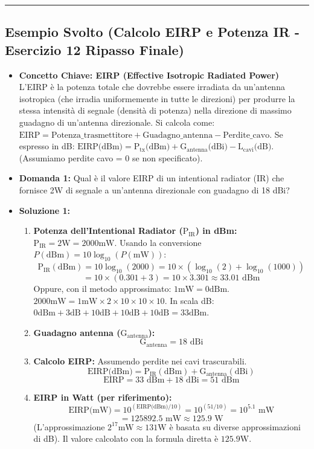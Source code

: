 \hrule %

\subsection{Esempio Svolto (Calcolo EIRP e Potenza IR - Esercizio 12 Ripasso Finale)}
\begin{itemize}
    \item \textbf{Concetto Chiave: EIRP (Effective Isotropic Radiated Power)}
    L'EIRP è la potenza totale che dovrebbe essere irradiata da un'antenna isotropica (che irradia uniformemente in tutte le direzioni) per produrre la stessa intensità di segnale (densità di potenza) nella direzione di massimo guadagno di un'antenna direzionale.
    Si calcola come: $\text{EIRP} = \text{Potenza\_trasmettitore} + \text{Guadagno\_antenna} - \text{Perdite\_cavo}$.
    Se espresso in dB: $\text{EIRP(dBm)} = \text{P}_{\text{tx}}\text{(dBm)} + \text{G}_{\text{antenna}}\text{(dBi)} - \text{L}_{\text{cavi}}\text{(dB)}$. (Assumiamo perdite cavo = 0 se non specificato).

    \item \textbf{Domanda 1:} Qual è il valore EIRP di un intentional radiator (IR) che fornisce 2W di segnale a un'antenna direzionale con guadagno di 18 dBi?
    \item \textbf{Soluzione 1:}
    \begin{enumerate}
        \item \textbf{Potenza dell'Intentional Radiator ($\text{P}_{\text{IR}}$) in dBm:}
        $\text{P}_{\text{IR}} = 2\text{W} = 2000\text{mW}$.
        Usando la conversione $P(\text{dBm}) = 10 \log_{10}(P(\text{mW}))$:
        \[ \text{P}_{\text{IR}}(\text{dBm}) = 10 \log_{10}(2000) = 10 \times (\log_{10}(2) + \log_{10}(1000)) \]
        \[ = 10 \times (0.301 + 3) = 10 \times 3.301 \approx 33.01 \text{ dBm} \]
        Oppure, con il metodo approssimato: $1\text{mW} = 0\text{dBm}$. $2000\text{mW} = 1\text{mW} \times 2 \times 10 \times 10 \times 10$.
        In scala dB: $0\text{dBm} + 3\text{dB} + 10\text{dB} + 10\text{dB} + 10\text{dB} = 33\text{dBm}$.
        \item \textbf{Guadagno antenna ($\text{G}_{\text{antenna}}$):}
        \[ \text{G}_{\text{antenna}} = 18 \text{ dBi} \]
        \item \textbf{Calcolo EIRP:}
        Assumendo perdite nei cavi trascurabili.
        \[ \text{EIRP(dBm)} = \text{P}_{\text{IR}}(\text{dBm}) + \text{G}_{\text{antenna}}(\text{dBi}) \]
        \[ \text{EIRP} = 33 \text{ dBm} + 18 \text{ dBi} = 51 \text{ dBm} \]
        \item \textbf{EIRP in Watt (per riferimento):}
        \[ \text{EIRP(mW)} = 10^{(\text{EIRP(dBm)}/10)} = 10^{(51/10)} = 10^{5.1} \text{ mW} \]
        \[ = 125892.5 \text{ mW} \approx 125.9 \text{ W} \]
        (L'approssimazione $2^{17} \text{mW} \approx 131 \text{W}$ è basata su diverse approssimazioni di dB). Il valore calcolato con la formula diretta è $125.9 \text{W}$.
    \end{enumerate}


\end{itemize}

